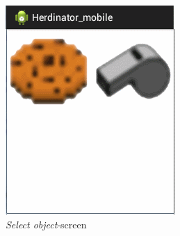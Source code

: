 \documentclass[a4paper,10pt]{report}
\begin{document}
\begin{figure}[ht]
\begin{minipage}[b]{0.30\linewidth}
			\includegraphics[width=\textwidth]{images/android-application-screen2.png}
			\caption{\emph{Select object}-screen}
			\label{fig:android-application-screen2}
		\end{minipage}
		\hspace{0.1cm}
		\begin{minipage}[b]{0.30\linewidth}
			\centering

\end{minipage}
\end{figure}
\end{document}

